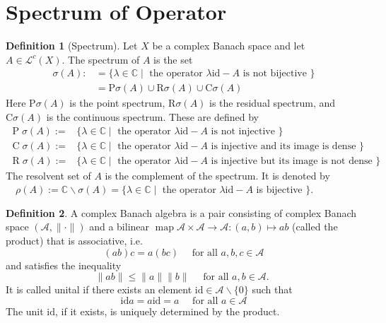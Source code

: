 \documentclass[12pt,a4paper]{book}
\theoremstyle{definition}
\newtheorem{defn}{Definition}[section]
\begin{document}
\newpage 
\section{Spectrum of Operator}
\begin{defn}[Spectrum]
Let $X$ be a complex Banach space and let $A \in \mathcal{L}^c(X)$. The spectrum of $A$ is the set
$$
\begin{aligned}
\sigma(A): & =\{\lambda \in \mathbb{C} \mid \text { the operator } \lambda \text{id}-A \text { is not bijective }\} \\
& =\mathrm{P} \sigma(A) \cup \mathrm{R} \sigma(A) \cup \mathrm{C} \sigma(A)
\end{aligned}
$$
Here $\mathrm{P} \sigma(A)$ is the point spectrum, $\mathrm{R} \sigma(A)$ is the residual spectrum, and $\mathrm{C} \sigma(A)$ is the continuous spectrum. These are defined by
\begin{align*}
    \operatorname{P} \sigma(A):=&\{\lambda \in \mathbb{C} \mid \text { the operator } \lambda \text{id}-A \text { is not injective }\}\\
    \operatorname{C} \sigma(A):=&\{\lambda \in \mathbb{C} \mid \text { the operator } \lambda \text{id}-A \text { is injective and its image is dense }\}\\
    \operatorname{R} \sigma(A):=&\{\lambda \in \mathbb{C} \mid \text { the operator } \lambda \text{id}-A \text { is injective but its image is not dense }\}
\end{align*}
The resolvent set of $A$ is the complement of the spectrum. It is denoted by
$\quad \rho(A):=\mathbb{C} \backslash \sigma(A)=\{\lambda \in \mathbb{C} \mid$ the operator $\lambda \text{id}-A$ is bijective $\}$.




\end{defn}
\begin{defn}
    A complex 
    Banach algebra is a pair consisting of complex Banach space $(\mathcal{A},\|\cdot\|)$ 
    and a bilinear $\operatorname{map} \mathcal{A} \times \mathcal{A} \rightarrow \mathcal{A}:(a, b) \mapsto a b$ 
    (called the product) that is associative, i.e.
    $$
    (a b) c=a(b c) \quad \text { for all } a, b, c \in \mathcal{A}
    $$
    and satisfies the inequality
    $$
    \|a b\| \leq\|a\|\|b\| \quad \text { for all } a, b \in \mathcal{A} \text {. }
    $$
    It is called unital if there exists an element $\text{id} \in \mathcal{A} \backslash\{0\}$ such that
    $$
    \text{id}  a=a \text{id} =a \quad \text { for all } a \in \mathcal{A}
    $$ 
    The unit $\text{id} $, if it exists, is uniquely determined by the product. 
\end{defn}
\end{document}
